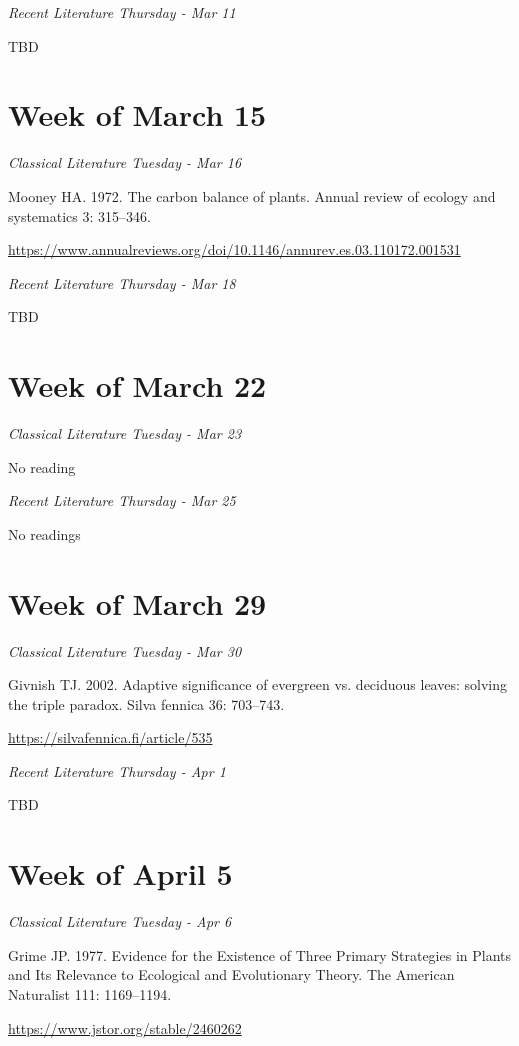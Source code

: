 \documentclass[12pt, notitlepage]{article}   	%
\begin{document}
{\textit{Recent Literature Thursday - Mar 11} \par
TBD \par

\section*{Week of March 15}
\textit{Classical Literature Tuesday - Mar 16} \par
Mooney HA. 1972. The carbon balance of plants. 
Annual review of ecology and systematics 3: 315–346. \par
\url{https://www.annualreviews.org/doi/10.1146/annurev.es.03.110172.001531}

\textit{Recent Literature Thursday - Mar 18} \par
TBD \par

\section*{Week of March 22}
\textit{Classical Literature Tuesday - Mar 23} \par
No reading \par

\textit{Recent Literature Thursday - Mar 25} \par
No readings \par

\section*{Week of March 29}
\textit{Classical Literature Tuesday - Mar 30} \par
Givnish TJ. 2002. Adaptive significance of evergreen vs. deciduous leaves: 
solving the triple paradox. Silva fennica 36: 703–743. \par
\url{https://silvafennica.fi/article/535}

\textit{Recent Literature Thursday - Apr 1} \par
TBD

\section*{Week of April 5}
\textit{Classical Literature Tuesday - Apr 6} \par
Grime JP. 1977. Evidence for the Existence of Three Primary Strategies in Plants and Its 
Relevance to Ecological and Evolutionary Theory. 
The American Naturalist 111: 1169–1194. \par
\url{https://www.jstor.org/stable/2460262}

}
\end{document}
